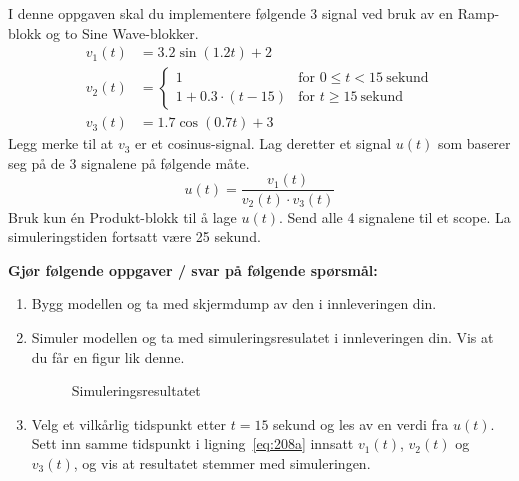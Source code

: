 


\item
  I denne oppgaven skal du implementere følgende 3 signal ved bruk av  
  en {\sf  Ramp}-blokk og to {\sf  Sine Wave}-blokker.
  \begin{align}
    v_{1}(t) & = 3.2\sin(1.2t)+2 \\
    v_{2}(t) & =
 \begin{cases}%
  1 &\text{for } 0\leq t<15~ \text{sekund}\\
   1+0.3{\cdot}(t-15)   & \text{for } t \geq 15 ~ \text{sekund} 
 \end{cases}\\
    v_{3}(t) & = 1.7\cos(0.7t)+3
  \end{align}
 Legg merke til at $v_{3}$ er et cosinus-signal. 
  Lag deretter et signal $u(t)$ som baserer seg på de 3 signalene på
  følgende måte. 
  \begin{equation}
    \label{eq:208a}
    u(t) = \frac{v_{1}(t)}{v_{2}(t){\cdot}v_{3}(t)} 
  \end{equation}
  Bruk kun én {\sf  Produkt}-blokk til å lage $u(t)$. Send alle 4
  signalene til et scope.
    {\color{red}La simuleringstiden fortsatt være 25 sekund.  }

      {\bf Gjør følgende oppgaver / svar på følgende spørsmål:    }
  \begin{enumerate}[label=g\arabic*)]
\item Bygg modellen og ta med skjermdump av den i innleveringen din.
  \item 
    Simuler modellen og ta med simuleringsresulatet
    i innleveringen din. Vis at du får en figur lik denne.

  \begin{figure}[H]
    \centering
    \hspace*{0mm}
    \caption{Simuleringsresultatet}
  \end{figure}

\item Velg et vilkårlig tidspunkt etter $t{=}15$ sekund og les av en verdi
fra $u(t)$. Sett inn samme 
tidspunkt i ligning~\eqref{eq:208a} innsatt $v_{1}(t)$, $v_{2}(t)$ og
$v_{3}(t)$,
og vis at resultatet stemmer med simuleringen. 

    \end{enumerate}
